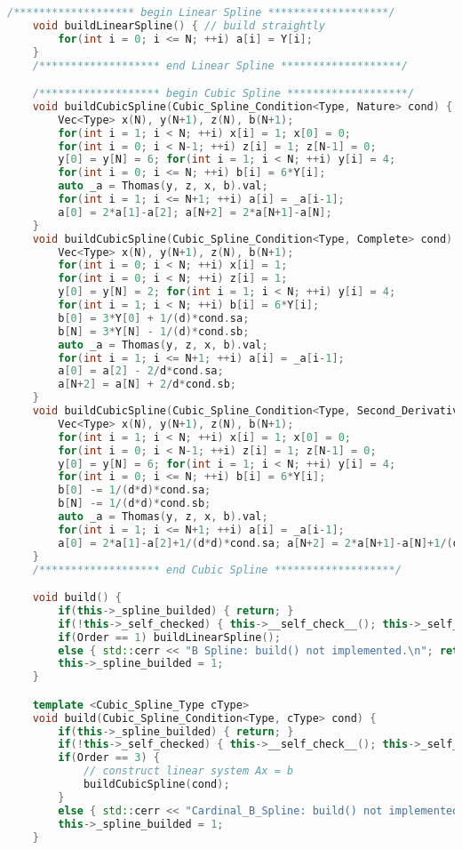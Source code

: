 \documentclass[lang=cn,a4paper,newtx,bibend=bibtex]{elegantpaper}
\begin{document}
\begin{lstlisting}[language=C++]
    /******************* begin Linear Spline *******************/
    void buildLinearSpline() { // build straightly 
        for(int i = 0; i <= N; ++i) a[i] = Y[i];
    }
    /******************* end Linear Spline *******************/

    /******************* begin Cubic Spline *******************/
    void buildCubicSpline(Cubic_Spline_Condition<Type, Nature> cond) {
		Vec<Type> x(N), y(N+1), z(N), b(N+1);
        for(int i = 1; i < N; ++i) x[i] = 1; x[0] = 0;
		for(int i = 0; i < N-1; ++i) z[i] = 1; z[N-1] = 0;
		y[0] = y[N] = 6; for(int i = 1; i < N; ++i) y[i] = 4;
		for(int i = 0; i <= N; ++i) b[i] = 6*Y[i];
		auto _a = Thomas(y, z, x, b).val;
		for(int i = 1; i <= N+1; ++i) a[i] = _a[i-1];
		a[0] = 2*a[1]-a[2]; a[N+2] = 2*a[N+1]-a[N];
    }
    void buildCubicSpline(Cubic_Spline_Condition<Type, Complete> cond) {
		Vec<Type> x(N), y(N+1), z(N), b(N+1);
        for(int i = 0; i < N; ++i) x[i] = 1;
		for(int i = 0; i < N; ++i) z[i] = 1;
		y[0] = y[N] = 2; for(int i = 1; i < N; ++i) y[i] = 4;
		for(int i = 1; i < N; ++i) b[i] = 6*Y[i];
		b[0] = 3*Y[0] + 1/(d)*cond.sa;
		b[N] = 3*Y[N] - 1/(d)*cond.sb;
		auto _a = Thomas(y, z, x, b).val;
		for(int i = 1; i <= N+1; ++i) a[i] = _a[i-1];
		a[0] = a[2] - 2/d*cond.sa;
		a[N+2] = a[N] + 2/d*cond.sb;
    }
    void buildCubicSpline(Cubic_Spline_Condition<Type, Second_Derivatives> cond) {
		Vec<Type> x(N), y(N+1), z(N), b(N+1);
        for(int i = 1; i < N; ++i) x[i] = 1; x[0] = 0;
		for(int i = 0; i < N-1; ++i) z[i] = 1; z[N-1] = 0;
		y[0] = y[N] = 6; for(int i = 1; i < N; ++i) y[i] = 4;
		for(int i = 0; i <= N; ++i) b[i] = 6*Y[i];
		b[0] -= 1/(d*d)*cond.sa;
		b[N] -= 1/(d*d)*cond.sb;
		auto _a = Thomas(y, z, x, b).val;
		for(int i = 1; i <= N+1; ++i) a[i] = _a[i-1];
		a[0] = 2*a[1]-a[2]+1/(d*d)*cond.sa; a[N+2] = 2*a[N+1]-a[N]+1/(d*d)*cond.sb;
    }
    /******************* end Cubic Spline *******************/

    void build() {
        if(this->_spline_builded) { return; }
        if(!this->_self_checked) { this->__self_check__(); this->_self_checked = 1; }
        if(Order == 1) buildLinearSpline();
        else { std::cerr << "B Spline: build() not implemented.\n"; return; }
        this->_spline_builded = 1;
    }

    template <Cubic_Spline_Type cType>
    void build(Cubic_Spline_Condition<Type, cType> cond) {
        if(this->_spline_builded) { return; }
        if(!this->_self_checked) { this->__self_check__(); this->_self_checked = 1; }
        if(Order == 3) {
			// construct linear system Ax = b
			buildCubicSpline(cond);
        }
        else { std::cerr << "Cardinal_B_Spline: build() not implemented.\n"; return; }
        this->_spline_builded = 1;
    }


\end{lstlisting}
\end{document}
